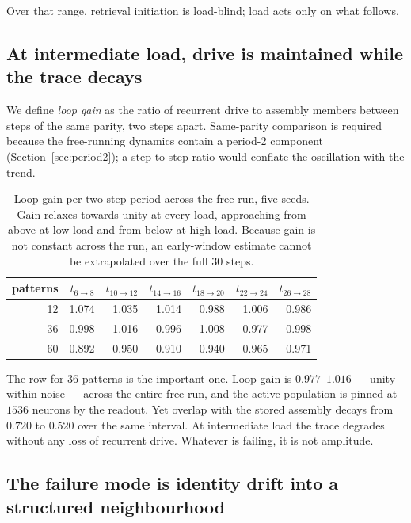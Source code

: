 \documentclass[10pt,twocolumn,a4paper]{article}
\begin{document}
Over that range, retrieval initiation is load-blind; load acts only on what follows.

\subsection{At intermediate load, drive is maintained while the trace decays}
\label{sec:gain}

We define \emph{loop gain} as the ratio of recurrent drive to assembly members between
steps of the same parity, two steps apart. Same-parity comparison is required because the
free-running dynamics contain a period-2 component (Section~\ref{sec:period2}); a
step-to-step ratio would conflate the oscillation with the trend.

\begin{table}[!t]
\centering
\caption{Loop gain per two-step period across the free run, five seeds. Gain relaxes
towards unity at every load, approaching from above at low load and from below at high
load. Because gain is not constant across the run, an early-window estimate cannot be
extrapolated over the full $30$ steps.}
\label{tab:gaintraj}
\small
\begin{tabular}{rrrrrrr}
\toprule
patterns & $t_{6\to8}$ & $t_{10\to12}$ & $t_{14\to16}$ & $t_{18\to20}$ & $t_{22\to24}$ & $t_{26\to28}$ \\
\midrule
12 & 1.074 & 1.035 & 1.014 & 0.988 & 1.006 & 0.986 \\
36 & 0.998 & 1.016 & 0.996 & 1.008 & 0.977 & 0.998 \\
60 & 0.892 & 0.950 & 0.910 & 0.940 & 0.965 & 0.971 \\
\bottomrule
\end{tabular}
\end{table}

The row for $36$ patterns is the important one. Loop gain is $0.977$--$1.016$ --- unity
within noise --- across the entire free run, and the active population is pinned at $1536$
neurons by the readout. Yet overlap with the stored assembly decays from $0.720$ to
$0.520$ over the same interval. At intermediate load the trace degrades without any loss
of recurrent drive. Whatever is failing, it is not amplitude.

\subsection{The failure mode is identity drift into a structured neighbourhood}
\label{sec:drift}
\end{document}
